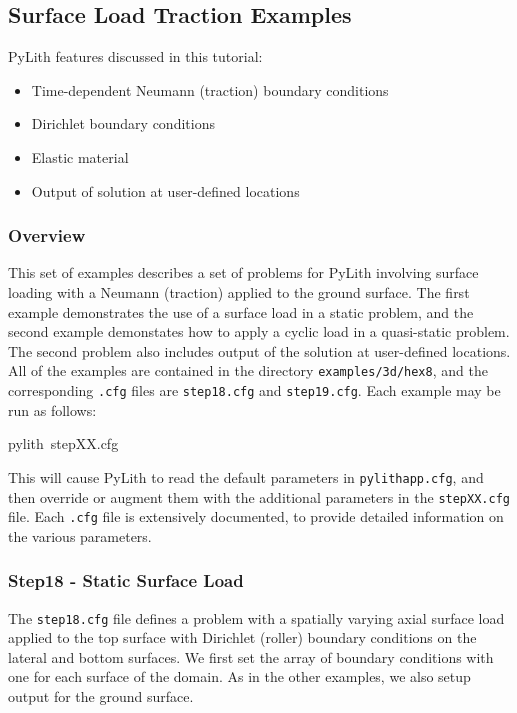 
\subsection{\label{sec:Tutorial-3d-hex8-surfload}Surface Load Traction Examples}

PyLith features discussed in this tutorial:
\begin{itemize}
\item Time-dependent Neumann (traction) boundary conditions
\item Dirichlet boundary conditions
\item Elastic material
\item Output of solution at user-defined locations
\end{itemize}

\subsubsection{Overview}

This set of examples describes a set of problems for PyLith involving
surface loading with a Neumann (traction) applied to the ground surface.
The first example demonstrates the use of a surface load in a static
problem, and the second example demonstates how to apply a cyclic
load in a quasi-static problem. The second problem also includes output
of the solution at user-defined locations. All of the examples are
contained in the directory \texttt{examples/3d/hex8}, and the corresponding
\texttt{.cfg} files are \texttt{step18.cfg} and \texttt{step19.cfg}.
Each example may be run as follows:
\begin{lyxcode}
pylith~stepXX.cfg
\end{lyxcode}
This will cause PyLith to read the default parameters in \texttt{pylithapp.cfg},
and then override or augment them with the additional parameters in
the \texttt{stepXX.cfg} file. Each \texttt{.cfg} file is extensively
documented, to provide detailed information on the various parameters.


\subsubsection{Step18 - Static Surface Load}

The \texttt{step18.cfg} file defines a problem with a spatially varying
axial surface load applied to the top surface with Dirichlet (roller)
boundary conditions on the lateral and bottom surfaces. We first set
the array of boundary conditions with one for each surface of the
domain. As in the other examples, we also setup output for the ground
surface.


